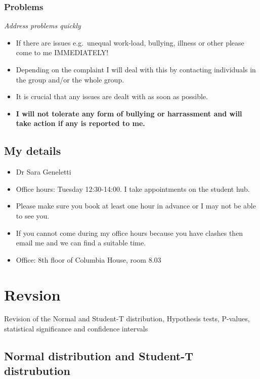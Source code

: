 \documentclass[
]{gitbook}
\providecommand{\tightlist}{%
  \setlength{\itemsep}{0pt}\setlength{\parskip}{0pt}}
\begin{document}
\hypertarget{problems}{%
\subsubsection{Problems}\label{problems}}

\emph{Address problems quickly}

\begin{itemize}
\tightlist
\item
  If there are issues e.g.~unequal work-load, bullying, illness or other please come to me IMMEDIATELY!
\item
  Depending on the complaint I will deal with this by contacting individuals in the group and/or the whole group.
\item
  It is crucial that any issues are dealt with as soon as possible.
\item
  \textbf{I will not tolerate any form of bullying or harrassment and will take action if any is reported to me.}
\end{itemize}

\hypertarget{my-details}{%
\subsection{My details}\label{my-details}}

\begin{itemize}
\tightlist
\item
  Dr Sara Geneletti
\item
  Office hours: Tuesday 12:30-14:00. I take appointments on the student hub.
\item
  Please make sure you book at least one hour in advance or I may not be able to see you.
\item
  If you cannot come during my office hours because you have clashes then email me and we can find a suitable time.
\item
  Office: 8th floor of Columbia House, room 8.03
\end{itemize}

\hypertarget{revsion}{%
\section{Revsion}\label{revsion}}

Revision of the Normal and Student-T distribution, Hypothesis tests, P-values, statistical significance and confidence intervals

\hypertarget{normal-distribution-and-student-t-distrubution}{%
\subsection{Normal distribution and Student-T distrubution}\label{normal-distribution-and-student-t-distrubution}}
\end{document}
